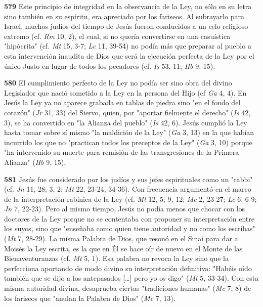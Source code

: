\documentclass[]{article}
\begin{document}
\textbf{579} Este principio de integridad en la observancia de la Ley,
no sólo en su letra sino también en su espíritu, era apreciado por los
fariseos. Al subrayarlo para Israel, muchos judíos del tiempo de Jesús
fueron conducidos a un celo religioso extremo (cf. \emph{Rm} 10, 2), el
cual, si no quería convertirse en una casuística "hipócrita" (cf.
\emph{Mt} 15, 3-7; \emph{Lc} 11, 39-54) no podía más que preparar al
pueblo a esta intervención inaudita de Dios que será la ejecución
perfecta de la Ley por el único Justo en lugar de todos los pecadores
(cf. \emph{Is} 53, 11; \emph{Hb} 9, 15).

\textbf{580} El cumplimiento perfecto de la Ley no podía ser sino obra
del divino Legislador que nació sometido a la Ley en la persona del Hijo
(cf \emph{Ga} 4, 4). En Jesús la Ley ya no aparece grabada en tablas de
piedra sino "en el fondo del corazón" (\emph{Jr} 31, 33) del Siervo,
quien, por "aportar fielmente el derecho" (\emph{Is} 42, 3), se ha
convertido en "la Alianza del pueblo" (\emph{Is} 42, 6). Jesús cumplió
la Ley hasta tomar sobre sí mismo "la maldición de la Ley" (\emph{Ga} 3,
13) en la que habían incurrido los que no "practican todos los preceptos
de la Ley" (\emph{Ga} 3, 10) porque "ha intervenido su muerte para
remisión de las transgresiones de la Primera Alianza" (\emph{Hb} 9, 15).

\textbf{581} Jesús fue considerado por los judíos y sus jefes
espirituales como un "rabbi" (cf. \emph{Jn} 11, 28; 3, 2; \emph{Mt} 22,
23-24, 34-36). Con frecuencia argumentó en el marco de la interpretación
rabínica de la Ley (cf. \emph{Mt} 12, 5; 9, 12; \emph{Mc} 2, 23-27;
\emph{Lc} 6, 6-9; \emph{Jn} 7, 22-23). Pero al mismo tiempo, Jesús no
podía menos que chocar con los doctores de la Ley porque no se
contentaba con proponer su interpretación entre los suyos, sino que
"enseñaba como quien tiene autoridad y no como los escribas" (\emph{Mt}
7, 28-29). La misma Palabra de Dios, que resonó en el Sinaí para dar a
Moisés la Ley escrita, es la que en Él se hace oír de nuevo en el Monte
de las Bienaventuranzas (cf. \emph{Mt} 5, 1). Esa palabra no revoca la
Ley sino que la perfecciona aportando de modo divino su interpretación
definitiva: "Habéis oído también que se dijo a los antepasados [\ldots{}]
pero yo os digo" (\emph{Mt} 5, 33-34). Con esta misma autoridad divina,
desaprueba ciertas "tradiciones humanas" (\emph{Mc} 7, 8) de los
fariseos que "anulan la Palabra de Dios" (\emph{Mc} 7, 13).
\end{document}

